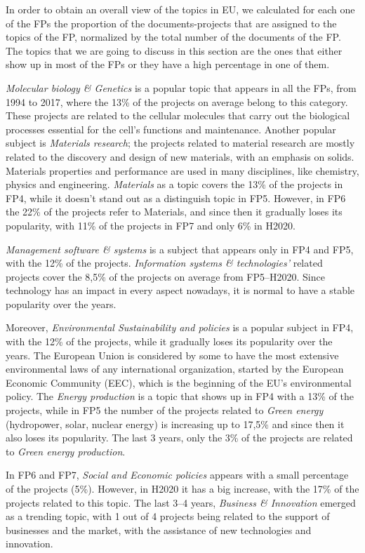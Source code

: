 \documentclass[12pt]{report}
\begin{document}
In order to obtain an overall view of the topics in EU, we calculated for each
one of the FPs the proportion of the documents-projects that are assigned to the
topics of the FP, normalized by the total number of the documents of the FP. The
topics that we are going to discuss in this section are the ones that either
show up in most of the FPs or they have a high percentage in one of them.

\emph{Molecular biology \& Genetics} is a popular topic that appears in all the
FPs, from 1994 to 2017, where the 13\% of the projects on average belong to this
category. These projects are related to the cellular molecules that carry out
the biological processes essential for the cell's functions and maintenance.
Another popular subject is \emph{Materials research}; the projects related to
material research are mostly related to the discovery and design of new
materials, with an emphasis on solids. Materials properties and performance are
used in many disciplines, like chemistry, physics and engineering.
\emph{Materials} as a topic covers the 13\% of the projects in FP4, while it
doesn't stand out as a distinguish topic in FP5. However, in FP6 the 22\% of the
projects refer to Materials, and since then it gradually loses its popularity,
with 11\% of the projects in FP7 and only 6\% in H2020.

\emph{Management software \& systems} is a subject that appears only in FP4 and
FP5, with the 12\% of the projects. \emph{Information systems \& technologies'}
related projects cover the 8,5\% of the projects on average from FP5--H2020.
Since technology has an impact in every aspect nowadays, it is normal to have a
stable popularity over the years.

Moreover, \emph{Environmental Sustainability and policies} is a popular subject
in FP4, with the 12\% of the projects, while it gradually loses its popularity
over the years. The European Union is considered by some to have the most
extensive environmental laws of any international organization, started by the
European Economic Community (EEC), which is the beginning of the EU's
environmental policy. The \emph{Energy production} is a topic that shows up in
FP4 with a 13\% of the projects, while in FP5 the number of the projects related
to \emph{Green energy} (hydropower, solar, nuclear energy) is increasing up to
17,5\% and since then it also loses its popularity. The last 3 years, only the
3\% of the projects are related to \emph{Green energy production}.

In FP6 and FP7, \emph{Social and Economic policies} appears with a small
percentage of the projects (5\%). However, in H2020 it has a big increase, with
the 17\% of the projects related to this topic. The last 3--4 years,
\emph{Business \& Innovation} emerged as a trending topic, with 1 out of 4
projects being related to the support of businesses and the market, with the
assistance of new technologies and innovation.
\end{document}
